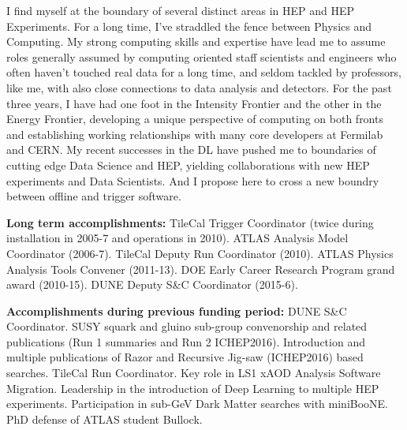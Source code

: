 %

I find myself at the boundary of several distinct areas in HEP and HEP
Experiments. For a long time, I've straddled the fence between Physics
and Computing.  My strong computing skills and expertise have lead me
to assume roles generally assumed by computing oriented staff
scientists and engineers who often haven't touched real data for a
long time, and seldom tackled by professors, like me, with also close
connections to data analysis and detectors.  For the past three years,
I have had one foot in the Intensity Frontier and the other in the
Energy Frontier, developing a unique perspective of computing on both
fronts and establishing working relationships with many core
developers at Fermilab and CERN. My recent successes in the DL have
pushed me to boundaries of cutting edge Data Science and HEP, yielding
collaborations with new HEP experiments and Data Scientists. And I
propose here to cross a new boundry between offline and trigger
software. 


{\bf Long term accomplishments:} TileCal Trigger Coordinator (twice during
installation in 2005-7 and operations in 2010). ATLAS Analysis Model
Coordinator (2006-7). TileCal Deputy Run Coordinator (2010). ATLAS
Physics Analysis Tools Convener (2011-13). DOE Early Career Research
Program grand award (2010-15). DUNE Deputy S\&C Coordinator (2015-6).

{\bf Accomplishments during previous funding period:} DUNE S\&C
Coordinator.  SUSY squark and gluino sub-group convenorship and
related publications (Run 1 summaries and Run 2
ICHEP2016). Introduction and multiple publications of Razor and
Recursive Jig-saw (ICHEP2016) based searches.  TileCal Run
Coordinator. Key role in LS1 xAOD Analysis Software Migration.
Leadership in the introduction of Deep Learning to multiple HEP
experiments. Participation in sub-GeV Dark Matter searches with
miniBooNE. PhD defense of ATLAS student Bullock.



